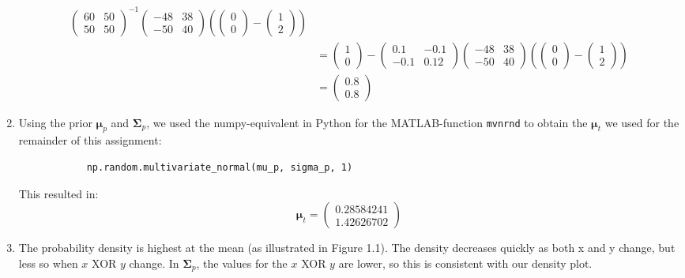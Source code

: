 \documentclass[a4paper,10pt]{article}
\numberwithin{equation}{section} %
\numberwithin{figure}{section} %
\numberwithin{table}{section} %
\theoremstyle{mytheor}
\begin{document}
\begin{enumerate}
\begin{align}
			\begin{pmatrix} 60 & 50 \\ 50 & 50 \end{pmatrix}^{-1}
			\begin{pmatrix} -48 & 38\\ -50 & 40 \end{pmatrix}
			(\begin{pmatrix} 0\\ 0 \end{pmatrix}-
			\begin{pmatrix} 1\\ 2 \end{pmatrix}) \\
			&= \begin{pmatrix} 1\\ 0 \end{pmatrix}-
			\begin{pmatrix} 0.1 & -0.1 \\ -0.1 & 0.12 \end{pmatrix}
			\begin{pmatrix} -48 & 38\\ -50 & 40 \end{pmatrix}
			(\begin{pmatrix} 0\\ 0 \end{pmatrix}-
			\begin{pmatrix} 1\\ 2 \end{pmatrix}) \\
			&= \begin{pmatrix} 0.8\\ 0.8 \end{pmatrix}
		\end{align}
	\item Using the prior $\boldsymbol \mu_p$ and $\boldsymbol \Sigma_p$, we used the numpy-equivalent in Python for the MATLAB-function \verb|mvnrnd| to obtain the $\boldsymbol \mu_t$ we used for the remainder of this assignment:
		\begin{verbatim}
			np.random.multivariate_normal(mu_p, sigma_p, 1)
		\end{verbatim}
		This resulted in:
		\begin{equation}
			\boldsymbol\mu_t = \begin{pmatrix} 0.28584241 \\ 1.42626702\end{pmatrix}
		\end{equation}
	\item The probability density is highest at the mean (as illustrated in Figure 1.1). The density decreases quickly as both x and y change, but less so when $x$ XOR $y$ change. In $\boldsymbol \Sigma_p$, the values for the $x$ XOR $y$ are lower, so this is consistent with our density plot.

\end{enumerate}
\end{document}
